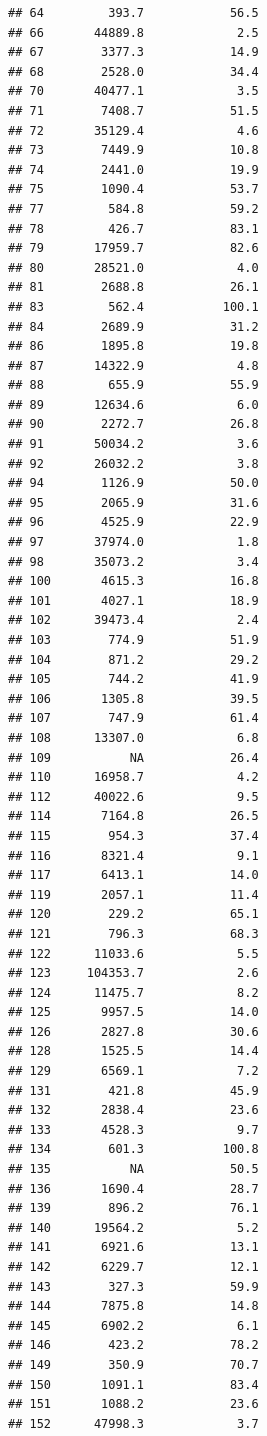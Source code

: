 \documentclass{beamer}\usepackage{graphicx, color}
\makeatletter
\newenvironment{kframe}{%
 \def\at@end@of@kframe{}%
 \ifinner\ifhmode%
  \def\at@end@of@kframe{\end{minipage}}%
  \begin{minipage}{\columnwidth}%
 \fi\fi%
 \def\FrameCommand##1{\hskip\@totalleftmargin \hskip-\fboxsep
 \colorbox{shadecolor}{##1}\hskip-\fboxsep
     \hskip-\linewidth \hskip-\@totalleftmargin \hskip\columnwidth}%
 \MakeFramed {\advance\hsize-\width
   \@totalleftmargin\z@ \linewidth\hsize
   \@setminipage}}%
 {\par\unskip\endMakeFramed%
 \at@end@of@kframe}
\newenvironment{knitrout}{}{} %
\makeatother
\begin{document}
\begin{frame}
\begin{knitrout}
\begin{kframe}
\begin{verbatim}
## 64         393.7            56.5
## 66       44889.8             2.5
## 67        3377.3            14.9
## 68        2528.0            34.4
## 70       40477.1             3.5
## 71        7408.7            51.5
## 72       35129.4             4.6
## 73        7449.9            10.8
## 74        2441.0            19.9
## 75        1090.4            53.7
## 77         584.8            59.2
## 78         426.7            83.1
## 79       17959.7            82.6
## 80       28521.0             4.0
## 81        2688.8            26.1
## 83         562.4           100.1
## 84        2689.9            31.2
## 86        1895.8            19.8
## 87       14322.9             4.8
## 88         655.9            55.9
## 89       12634.6             6.0
## 90        2272.7            26.8
## 91       50034.2             3.6
## 92       26032.2             3.8
## 94        1126.9            50.0
## 95        2065.9            31.6
## 96        4525.9            22.9
## 97       37974.0             1.8
## 98       35073.2             3.4
## 100       4615.3            16.8
## 101       4027.1            18.9
## 102      39473.4             2.4
## 103        774.9            51.9
## 104        871.2            29.2
## 105        744.2            41.9
## 106       1305.8            39.5
## 107        747.9            61.4
## 108      13307.0             6.8
## 109           NA            26.4
## 110      16958.7             4.2
## 112      40022.6             9.5
## 114       7164.8            26.5
## 115        954.3            37.4
## 116       8321.4             9.1
## 117       6413.1            14.0
## 119       2057.1            11.4
## 120        229.2            65.1
## 121        796.3            68.3
## 122      11033.6             5.5
## 123     104353.7             2.6
## 124      11475.7             8.2
## 125       9957.5            14.0
## 126       2827.8            30.6
## 128       1525.5            14.4
## 129       6569.1             7.2
## 131        421.8            45.9
## 132       2838.4            23.6
## 133       4528.3             9.7
## 134        601.3           100.8
## 135           NA            50.5
## 136       1690.4            28.7
## 139        896.2            76.1
## 140      19564.2             5.2
## 141       6921.6            13.1
## 142       6229.7            12.1
## 143        327.3            59.9
## 144       7875.8            14.8
## 145       6902.2             6.1
## 146        423.2            78.2
## 149        350.9            70.7
## 150       1091.1            83.4
## 151       1088.2            23.6
## 152      47998.3             3.7

\end{verbatim}
\end{kframe}
\end{knitrout}
\end{frame}
\end{document}
